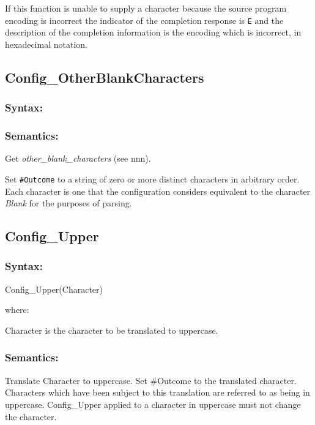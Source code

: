 If this function is unable to supply a character because the source
program encoding is incorrect the indicator of the completion response
is \texttt{\textquotesingle{}E\textquotesingle{}} and the description of
the completion information is the encoding which is incorrect, in
hexadecimal notation.

\subsection{Config\_OtherBlankCharacters}\label{config_otherblankcharacters}

\subsubsection{Syntax:}\label{syntax-1}



\subsubsection{Semantics:}\label{semantics-2}

Get \emph{other\_blank\_characters} (see nnn).

Set \texttt{\#Outcome} to a string of zero or more distinct characters
in arbitrary order. Each character is one that the configuration
considers equivalent to the character \emph{Blank} for the purposes of
parsing.

\subsection{Config\_Upper}\label{config_upper}

\subsubsection{Syntax:}\label{syntax-2}

Config\_Upper(Character)

where:

Character is the character to be translated to uppercase.

\subsubsection{Semantics:}\label{semantics-3}

Translate Character to uppercase. Set \#Outcome to the translated
character. Characters which have been subject to this translation are
referred to as being in uppercase. Config\_Upper applied to a character
in uppercase must not change the character.


